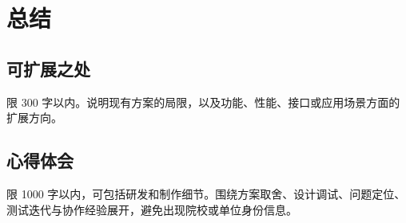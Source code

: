 ﻿\chapter{总结}
\section{可扩展之处}
限 300 字以内。说明现有方案的局限，以及功能、性能、接口或应用场景方面的扩展方向。
\section{心得体会}
限 1000 字以内，可包括研发和制作细节。围绕方案取舍、设计调试、问题定位、测试迭代与协作经验展开，避免出现院校或单位身份信息。
